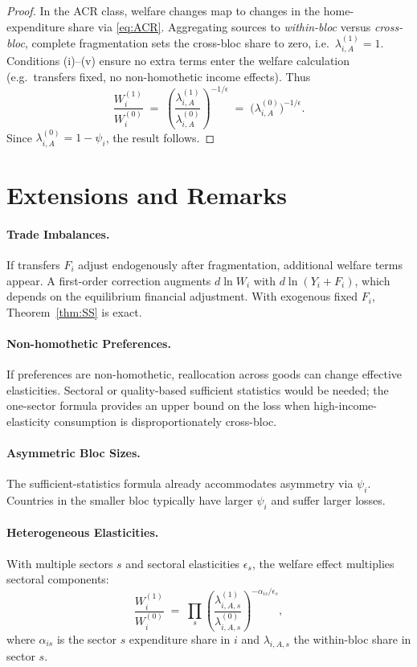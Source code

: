 \documentclass[11pt]{article}
\begin{document}
\begin{proof}
In the ACR class, welfare changes map to changes in the home-expenditure share via \eqref{eq:ACR}. Aggregating sources to \emph{within-bloc} versus \emph{cross-bloc}, complete fragmentation sets the cross-bloc share to zero, i.e.\ $\lambda_{i,A}^{(1)}=1$. Conditions (i)--(v) ensure no extra terms enter the welfare calculation (e.g.\ transfers fixed, no non-homothetic income effects). Thus
\begin{equation}
\frac{W_i^{(1)}}{W_i^{(0)}} \;=\; \left(\frac{\lambda_{i,A}^{(1)}}{\lambda_{i,A}^{(0)}}\right)^{-1/\epsilon} \;=\; \big(\lambda_{i,A}^{(0)}\big)^{-1/\epsilon}.
\end{equation}
Since $\lambda_{i,A}^{(0)} = 1-\psi_i$, the result follows.
\end{proof}

\section{Extensions and Remarks}
\paragraph{Trade Imbalances.} If transfers $F_i$ adjust endogenously after fragmentation, additional welfare terms appear. A first-order correction augments $d\ln W_i$ with $d\ln(Y_i+F_i)$, which depends on the equilibrium financial adjustment. With exogenous fixed $F_i$, Theorem~\ref{thm:SS} is exact.

\paragraph{Non-homothetic Preferences.} If preferences are non-homothetic, reallocation across goods can change effective elasticities. Sectoral or quality-based sufficient statistics would be needed; the one-sector formula provides an upper bound on the loss when high-income-elasticity consumption is disproportionately cross-bloc.

\paragraph{Asymmetric Bloc Sizes.} The sufficient-statistics formula already accommodates asymmetry via $\psi_i$. Countries in the smaller bloc typically have larger $\psi_i$ and suffer larger losses.

\paragraph{Heterogeneous Elasticities.} With multiple sectors $s$ and sectoral elasticities $\epsilon_s$, the welfare effect multiplies sectoral components:
\begin{equation}
\frac{W_i^{(1)}}{W_i^{(0)}} \;=\; \prod_{s} \left(\frac{\lambda_{i,A,s}^{(1)}}{\lambda_{i,A,s}^{(0)}}\right)^{- \alpha_{is}/\epsilon_s},
\end{equation}
where $\alpha_{is}$ is the sector $s$ expenditure share in $i$ and $\lambda_{i,A,s}$ the within-bloc share in sector $s$.
\end{document}
